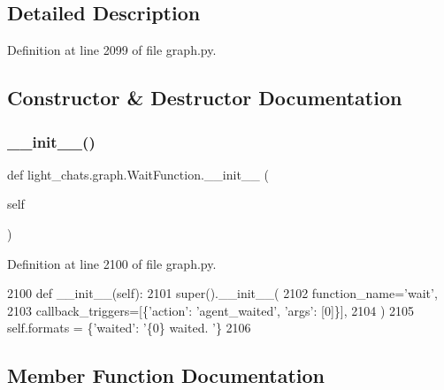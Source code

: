 \subsection{Detailed Description}


Definition at line 2099 of file graph.\+py.



\subsection{Constructor \& Destructor Documentation}
\mbox{\label{classlight__chats_1_1graph_1_1WaitFunction_a08ecc57f17be491ed6a1ee81f38d8d65}} 
\subsubsection{\texorpdfstring{\+\_\+\+\_\+init\+\_\+\+\_\+()}{\_\_init\_\_()}}
{\footnotesize\ttfamily def light\+\_\+chats.\+graph.\+Wait\+Function.\+\_\+\+\_\+init\+\_\+\+\_\+ (\begin{DoxyParamCaption}\item[{}]{self }\end{DoxyParamCaption})}



Definition at line 2100 of file graph.\+py.


\begin{DoxyCode}
2100     \textcolor{keyword}{def }\_\_init\_\_(self):
2101         super().\_\_init\_\_(
2102             function\_name=\textcolor{stringliteral}{'wait'},
2103             callback\_triggers=[\{\textcolor{stringliteral}{'action'}: \textcolor{stringliteral}{'agent\_waited'}, \textcolor{stringliteral}{'args'}: [0]\}],
2104         )
2105         self.formats = \{\textcolor{stringliteral}{'waited'}: \textcolor{stringliteral}{'\{0\} waited. '}\}
2106 
\end{DoxyCode}


\subsection{Member Function Documentation}
\mbox{\label{classlight__chats_1_1graph_1_1WaitFunction_a3349dc4d65c4b33440624bdbbeeb420c}} 
